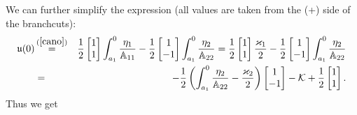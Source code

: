\documentclass[10pt,oneside,reqno]{amsart}
\numberwithin{equation}{section}
\def\ds{\displaystyle}
\def\eqref#1{(\ref{#1})}
\begin{document}
We can further simplify the expression (all values are taken from the (+) side of the branchcuts):
\begin{eqnarray*}
  \mathfrak{u}(0) &\ds\mathop{=}^{\eqref{cano}}& \frac{1}{2}\begin{bmatrix}
                                1\\
1\\
                               \end{bmatrix}\int_{a_1}^0\frac{\eta_1}{\mathbb{A}_{11}}-\frac{1}{2}\begin{bmatrix}
1\\
-1\\
\end{bmatrix}\int_{a_1}^0\frac{\eta_2}{\mathbb{A}_{22}}=\frac{1}{2}\begin{bmatrix}
1\\
1\\
\end{bmatrix}\frac{\varkappa_1}{2}-\frac{1}{2}\begin{bmatrix}
1\\
-1\\
\end{bmatrix}\int_{a_1}^0\frac{\eta_2}{\mathbb{A}_{22}}\\
&=&-\frac{1}{2}\left(\int_{a_1}^0\frac{\eta_2}{\mathbb{A}_{22}}-\frac{\varkappa_2}{2}\right)\begin{bmatrix}
                                                                                          1\\
-1\\
                                                                                         \end{bmatrix}-\mathcal{K}+\frac{1}{2}\begin{bmatrix}
1\\
1\\
\end{bmatrix}.
\end{eqnarray*}
Thus we get
\end{document}
